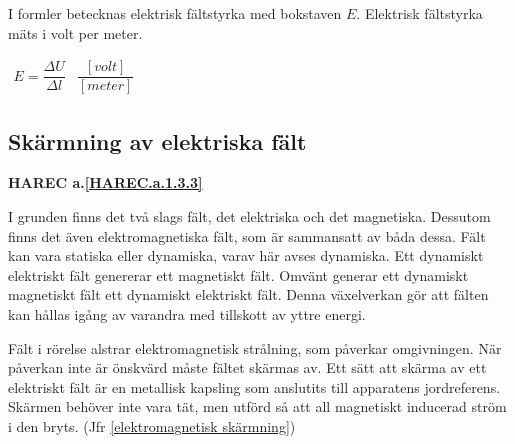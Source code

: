 I formler betecknas elektrisk fältstyrka med bokstaven \(E\).
Elektrisk fältstyrka mäts i volt per meter.

\(
\begin{array}{cc}
E=\dfrac{\Delta U}{\Delta l} & \dfrac{[volt]}{[meter]}
\end{array}
\)

\subsection{Skärmning av elektriska fält}
\textbf{HAREC a.\ref{HAREC.a.1.3.3}\label{myHAREC.a.1.3.3}}
\label{elektrostatik skärmning}

I grunden finns det två slags fält, det elektriska och det magnetiska.
Dessutom finns det även elektromagnetiska fält, som är sammansatt av båda dessa.
Fält kan vara statiska eller dynamiska, varav här avses dynamiska.
Ett dynamiskt elektriskt fält genererar ett magnetiskt fält.
Omvänt generar ett dynamiskt magnetiskt fält ett dynamiskt elektriskt fält.
Denna växelverkan gör att fälten kan hållas igång av varandra med tillskott av
yttre energi.

Fält i rörelse alstrar elektromagnetisk strålning, som påverkar omgivningen.
När påverkan inte är önskvärd måste fältet skärmas av.
Ett sätt att skärma av ett elektriskt fält är en metallisk kapsling som
anslutits till apparatens jordreferens.
Skärmen behöver inte vara tät, men utförd så att all magnetiskt inducerad ström
i den bryts. (Jfr \ref{elektromagnetisk skärmning})

